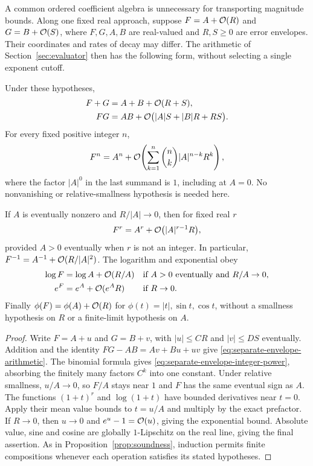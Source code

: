 A common ordered coefficient algebra is unnecessary for transporting
magnitude bounds. Along one fixed real approach, suppose
$F=A+\mathcal O(R)$ and $G=B+\mathcal O(S)$, where $F,G,A,B$ are real-valued and
$R,S\ge0$ are error envelopes. Their coordinates and rates of decay may
differ. The arithmetic of Section~\ref{sec:evaluator} then has the
following form, without selecting a single exponent cutoff.

\begin{proposition}
\label{prop:separate-error-envelopes}
Under these hypotheses,
\begin{equation}
\begin{aligned}
 F+G&=A+B+\mathcal O(R+S),\\
 FG&=AB+\mathcal O\bigl(|A|S+|B|R+RS\bigr).
\end{aligned}
\label{eq:separate-envelope-arithmetic}
\end{equation}
For every fixed positive integer $n$,
\begin{equation}
 F^n=A^n+\mathcal O\!\left(
   \sum_{k=1}^{n}\binom nk |A|^{n-k}R^k\right),
\label{eq:separate-envelope-integer-power}
\end{equation}
where the factor $|A|^0$ in the last summand is $1$, including at $A=0$.
No nonvanishing or relative-smallness hypothesis is needed here.

If $A$ is eventually nonzero and $R/|A|\to0$, then for fixed real $r$
\[
 F^r=A^r+\mathcal O\bigl(|A|^{r-1}R\bigr),
\]
provided $A>0$ eventually when $r$ is not an integer. In particular,
$F^{-1}=A^{-1}+\mathcal O(R/|A|^2)$. The logarithm and exponential obey
\begin{equation}
\begin{aligned}
 \log F&=\log A+\mathcal O(R/A)
   &&\text{if }A>0\text{ eventually and }R/A\to0,\\
 e^F&=e^A+\mathcal O(e^A R)
   &&\text{if }R\to0.
\end{aligned}
\label{eq:separate-envelope-log-exp}
\end{equation}
Finally $\phi(F)=\phi(A)+\mathcal O(R)$ for
$\phi(t)=|t|,\sin t,\cos t$, without a smallness hypothesis on $R$ or
a finite-limit hypothesis on $A$.
\end{proposition}

\begin{proof}
Write $F=A+u$ and $G=B+v$, with $|u|\le CR$ and $|v|\le DS$
eventually. Addition and the identity
$FG-AB=Av+Bu+uv$ give \eqref{eq:separate-envelope-arithmetic}.
The binomial formula gives \eqref{eq:separate-envelope-integer-power},
absorbing the finitely many factors $C^k$ into one constant.
Under relative smallness, $u/A\to0$, so $F/A$ stays near $1$ and
$F$ has the same eventual sign as $A$. The functions $(1+t)^r$ and
$\log(1+t)$ have bounded derivatives near $t=0$. Apply their mean value
bounds to $t=u/A$ and multiply by the exact prefactor.
If $R\to0$, then $u\to0$ and $e^u-1=\mathcal O(u)$, giving the exponential
bound. Absolute value, sine and cosine are globally $1$-Lipschitz on
the real line, giving the final assertion. As in
Proposition~\ref{prop:soundness}, induction permits finite compositions
whenever each operation satisfies its stated hypotheses.
\end{proof}

